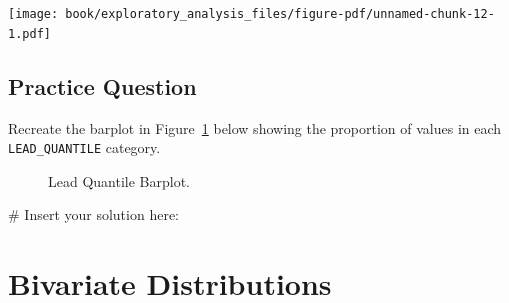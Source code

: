 \documentclass[
  letterpaper,
]{latex/krantz}
\makeatletter
\newenvironment{Shaded}{\begin{snugshade}}{\end{snugshade}}
\newcommand{\CommentTok}[1]{\textcolor[rgb]{0.37,0.37,0.37}{#1}}
\newenvironment{kframe}{%
\medskip{}
\setlength{\fboxsep}{.8em}
 \def\at@end@of@kframe{}%
 \ifinner\ifhmode%
  \def\at@end@of@kframe{\end{minipage}}%
  \begin{minipage}{\columnwidth}%
 \fi\fi%
 \def\FrameCommand##1{\hskip\@totalleftmargin \hskip-\fboxsep
 \colorbox{shadecolor}{##1}\hskip-\fboxsep
     \hskip-\linewidth \hskip-\@totalleftmargin \hskip\columnwidth}%
 \MakeFramed {\advance\hsize-\width
   \@totalleftmargin\z@ \linewidth\hsize
   \@setminipage}}%
 {\par\unskip\endMakeFramed%
 \at@end@of@kframe}
\renewenvironment{Shaded}{\begin{kframe}}{\end{kframe}}
\makeatother
\begin{document}
\begin{center}
\texttt{[image: book/exploratory\_analysis\_files/figure-pdf/unnamed-chunk-12-1.pdf]}
\end{center}

\subsection{Practice Question}\label{practice-question-6}

Recreate the barplot in Figure~\ref{fig-lead-quantile-bar-plot} below
showing the proportion of values in each \texttt{LEAD\_QUANTILE}
category.

\begin{figure}


\caption{\label{fig-lead-quantile-bar-plot}Lead Quantile Barplot.}

\end{figure}%

\begin{Shaded}
\begin{Highlighting}[]
\CommentTok{\# Insert your solution here:}
\end{Highlighting}
\end{Shaded}

\section{\texorpdfstring{Bivariate Distributions
}{Bivariate Distributions }}\label{bivariate-distributions}
\end{document}
